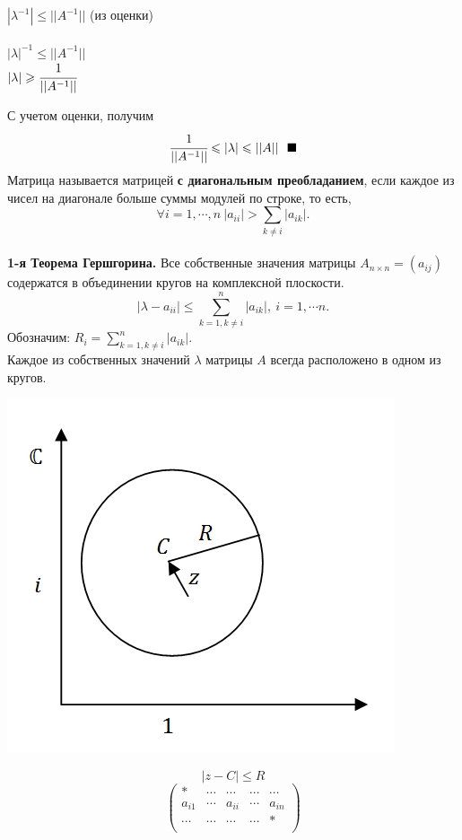 \documentclass[12pt]{article}
\theoremstyle{definition}
\numberwithin{equation}{section}
\begin{document}
	\begin{center}
		$|\lambda^{-1}|\leqslant||A^{-1}||$ (из оценки)\\~\\
		$|\lambda|^{-1}\leqslant ||A^{-1}||$\\
		$|\lambda|\geqslant \cfrac{1}{||A^{-1}||}$
	\end{center}
	С учетом оценки, получим $$\cfrac{1}{||A^{-1}||}\leqslant|\lambda|\leqslant||A||~~\blacksquare$$ 
	Матрица называется матрицей \textbf{с диагональным преобладанием}, если каждое из чисел на диагонале больше суммы модулей по строке, то есть, $$\forall i=1,\cdots,n~|a_{ii}|>\sum\limits_{k\neq i}|a_{ik}|.$$
	~\\
	\textbf{1-я Теорема Гершгорина.} Все собственные значения матрицы $A_{n \times n}=(a_{ij})$ содержатся в объединении кругов на комплексной плоскости. $$|\lambda-a_{ii}|\leqslant \sum\limits_{k=1, k\neq i}^n|a_{ik}|,~i=1,\cdots n.$$
	Обозначим: $R_i=\sum\limits_{k=1, k\neq i}^n|a_{ik}|.$\\
	Каждое из собственных значений $\lambda$ матрицы $A$ всегда расположено в одном из кругов.
	\begin{center}
		\includegraphics[scale=0.8]{l9_2.png}
	\end{center}
	$$|z-C|\leqslant R$$
	\[\begin{pmatrix}
	* & \cdots & \cdots & \cdots & \cdots\\
	a_{i1} & \cdots & a_{ii} & \cdots & a_{in}\\
	\cdots & \cdots & \cdots & \cdots & *\\
	\end{pmatrix}\]
\end{document}
